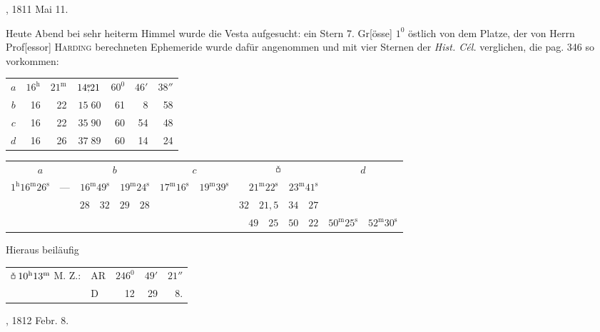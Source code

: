 \clearpage\begingroup

\def\ObsJuno{\mathord{\tikz[baseline=-.2ex,x=1em,y=1em,line width=.045em]{
  \draw (.23,.72)--(.23,-.04);
  \draw (.05,.63)--(.41,.39) (.05,.39)--(.41,.63);
  \draw (.06,.13)--(.40,.13);}}}
\hypertarget{native-277-10}{}
, 1811 Mai 11.

Heute Abend bei sehr heiterm Himmel wurde die Vesta aufgesucht: ein Stern 7. Gr[össe] $1^0$ östlich von dem Platze, der von Herrn Prof[essor] \textsc{Harding} berechneten Ephemeride wurde dafür angenommen und mit vier Sternen der \textit{Hist. Cél.} verglichen, die pag. 346 so vorkommen:
\begin{center}\begin{tabular}{c|rrr|rrr}
$a$&$16^{\mathrm h}$&$21^{\mathrm m}$&$14\mathord{\overset{\mathrm{s}}{,}}21$&$60^0$&$46'$&$38''$\\
$b$&16&22&$15\;60$&61&8&58\\
$c$&16&22&$35\;90$&60&54&48\\
$d$&16&26&$37\;89$&60&14&24
\end{tabular}\end{center}
\begin{center}\fontsize{9}{11}\selectfont\setlength{\tabcolsep}{2pt}
\begin{tabular}{rr|rr|rr|rr|rr}
\multicolumn{2}{c}{$a$}&\multicolumn{2}{c}{$b$}&\multicolumn{2}{c}{$c$}&\multicolumn{2}{c}{$\ObsVesta$}&\multicolumn{2}{c}{$d$}\\
$1^{\mathrm h}16^{\mathrm m}26^{\mathrm s}$&—&$16^{\mathrm m}49^{\mathrm s}$&$19^{\mathrm m}24^{\mathrm s}$&$17^{\mathrm m}16^{\mathrm s}$&$19^{\mathrm m}39^{\mathrm s}$&$21^{\mathrm m}22^{\mathrm s}$&$23^{\mathrm m}41^{\mathrm s}$&&\\
&&$28\quad32$&$29\quad28$&&&$32\quad21{,}5$&$34\quad27$&&\\
&&&&&&$49\quad25$&$50\quad22$&$50^{\mathrm m}25^{\mathrm s}$&$52^{\mathrm m}30^{\mathrm s}$
\end{tabular}\end{center}
\clearpage{}
\noindent Hieraus beiläufig
\begin{center}\begin{tabular}{r lrrr}
$\ObsVesta\;10^{\mathrm h}13^{\mathrm m}$ M. Z.:&AR&$246^0$&$49'$&$21''$\\
&D&12&29&8.
\end{tabular}\end{center}
\medskip{}, 1812 Febr. 8.

